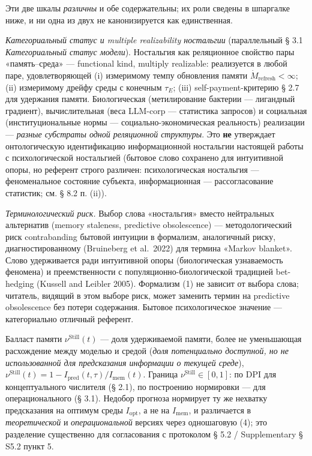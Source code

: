 \documentclass[pdflatex,sn-mathphys-ay]{sn-jnl}
\providecommand{\lt}{<}\providecommand{\gt}{>}
\begin{document}
Эти две шкалы \emph{различны} и обе содержательны; их роли сведены в шпаргалке ниже, и ни одна из двух не канонизируется как единственная.



\emph{Категориальный статус и multiple realizability ностальгии} (параллельный § 3.1 \emph{Категориальный статус модели}). Ностальгия как реляционное свойство пары «память--среда» --- functional kind, multiply realizable: реализуется в любой паре, удовлетворяющей (i) измеримому темпу обновления памяти \(\dot{M}_{\text{refresh}} \lt \infty\); (ii) измеримому дрейфу среды с конечным \(\tau_E\); (iii) self-payment-критерию § 2.7 для удержания памяти. Биологическая (метилирование бактерии --- лигандный градиент), вычислительная (веса LLM-corp --- статистика запросов) и социальная (институциональные нормы --- социально-экономическая реальность) реализации --- \emph{разные субстраты одной реляционной структуры}. Это \textbf{не} утверждает онтологическую идентификацию информационной ностальгии настоящей работы с психологической ностальгией (бытовое слово сохранено для интуитивной опоры, но референт строго различен: психологическая ностальгия --- феноменальное состояние субъекта, информационная --- рассогласование статистик; см. § 8.2 п. (ii)).



\emph{Терминологический риск.} Выбор слова «ностальгия» вместо нейтральных альтернатив (memory staleness, predictive obsolescence) --- методологический риск contrabanding бытовой интуиции в формализм, аналогичный риску, диагностированному (Bruineberg et al.~2022) для термина «Markov blanket». Слово удерживается ради интуитивной опоры (биологическая узнаваемость феномена) и преемственности с популяционно-биологической традицией bet-hedging (Kussell and Leibler 2005). Формализм (1) не зависит от выбора слова; читатель, видящий в этом выборе риск, может заменить термин на predictive obsolescence без потери содержания. Бытовое психологическое значение --- категориально отличный референт.



Балласт памяти \(\nu^{\text{Still}}(t)\) --- доля удерживаемой памяти, более не уменьшающая расхождение между моделью и средой (\emph{доля потенциально доступной, но не использованной для предсказания информации о текущей среде}), \(\nu^{\text{Still}}(t) = 1 - I_{\text{pred}}(t,\tau)/I_{\text{mem}}(t)\). Граница \(\nu^{\text{Still}} \in [0,1]\): по DPI для концептуального числителя (§ 2.1), по построению нормировки --- для операционального (§ 3.1). Недобор прогноза нормирует ту же нехватку предсказания на оптимум среды \(I_{\text{opt}}\), а не на \(I_{\text{mem}}\), и различается в \emph{теоретической} и \emph{операциональной} версиях через одношаговую (4); это разделение существенно для согласования с протоколом § 5.2 / Supplementary § S5.2 пункт 5.
\end{document}
